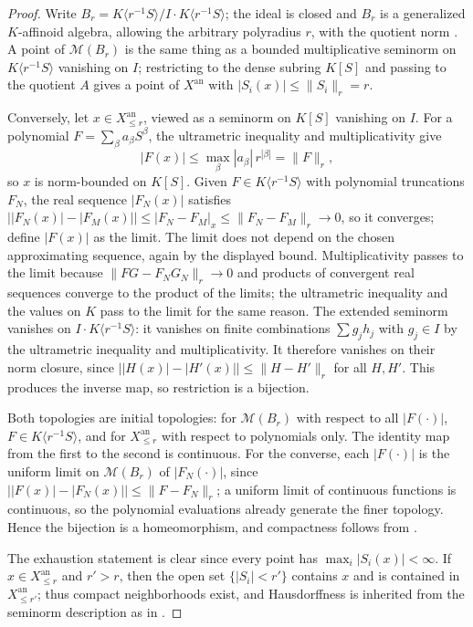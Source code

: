 \begin{proof}
Write $B_r=K\langle r^{-1}S\rangle/I\cdot K\langle r^{-1}S\rangle$; the
ideal is closed and $B_r$ is a generalized $K$-affinoid algebra,
allowing the arbitrary polyradius $r$, with the quotient
norm \cite[\S2.1]{Berk12}.  A point of $\mathcal M(B_r)$ is the same
thing as a bounded multiplicative seminorm on
$K\langle r^{-1}S\rangle$ vanishing on $I$; restricting to the dense
subring $K[S]$ and passing to the quotient $A$ gives a point of
$X^{\mathrm{an}}$ with $|S_i(x)|\leq\|S_i\|_r=r$.

Conversely, let $x\in X^{\mathrm{an}}_{\leq r}$, viewed as a seminorm
on $K[S]$ vanishing on $I$.  For a polynomial
$F=\sum_\beta a_\beta S^\beta$, the ultrametric inequality and
multiplicativity give
\[
 |F(x)|\leq\max_\beta|a_\beta|\,r^{|\beta|}=\|F\|_r,
\]
so $x$ is norm-bounded on $K[S]$.  Given
$F\in K\langle r^{-1}S\rangle$ with polynomial truncations $F_N$,
the real sequence $|F_N(x)|$ satisfies
$\bigl||F_N(x)|-|F_M(x)|\bigr|\leq|F_N-F_M|_x\leq\|F_N-F_M\|_r\to0$, so
it converges; define $|F(x)|$ as the limit.  The limit does not depend
on the chosen approximating sequence, again by the displayed bound.
Multiplicativity passes to the limit because
$\|FG-F_NG_N\|_r\to0$ and products of convergent real sequences
converge to the product of the limits; the ultrametric inequality and the
values on $K$ pass to the limit for the same reason.  The extended
seminorm vanishes on $I\cdot K\langle r^{-1}S\rangle$: it vanishes on
finite combinations $\sum g_jh_j$ with $g_j\in I$ by the ultrametric
inequality and multiplicativity.  It therefore vanishes on their norm
closure, since
$\bigl||H(x)|-|H'(x)|\bigr|\leq\|H-H'\|_r$ for all $H,H'$.
This produces the inverse map, so restriction is a bijection.

Both topologies are initial topologies: for
$\mathcal M(B_r)$ with respect to all $|F(\cdot)|$,
$F\in K\langle r^{-1}S\rangle$, and for
$X^{\mathrm{an}}_{\leq r}$ with respect to polynomials only.  The
identity map from the first to the second is continuous.  For the
converse, each $|F(\cdot)|$ is the uniform limit on
$\mathcal M(B_r)$ of $|F_N(\cdot)|$, since
$\bigl||F(x)|-|F_N(x)|\bigr|\leq\|F-F_N\|_r$; a uniform limit of
continuous functions is continuous, so the polynomial evaluations already
generate the finer topology.  Hence the bijection is a homeomorphism, and
compactness follows from .

The exhaustion statement is clear since every point has
$\max_i|S_i(x)|<\infty$.  If $x\in X^{\mathrm{an}}_{\leq r}$ and
$r'>r$, then the open set $\{|S_i|<r'\}$ contains $x$ and is
contained in $X^{\mathrm{an}}_{\leq r'}$; thus compact neighborhoods
exist, and Hausdorffness is inherited from the seminorm description as in
.
\end{proof}

